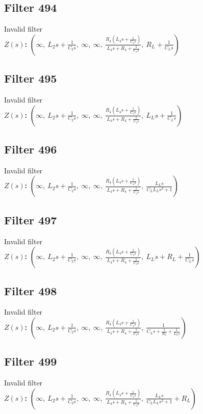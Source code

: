 \documentclass{article}
\begin{document}
\subsection*{Filter 494}
Invalid filter \\ 
\textbf{$Z(s)$:} $\left( \infty, \  L_{2} s + \frac{1}{C_{2} s}, \  \infty, \  \infty, \  \frac{R_{4} \left(L_{4} s + \frac{1}{C_{4} s}\right)}{L_{4} s + R_{4} + \frac{1}{C_{4} s}}, \  R_{L} + \frac{1}{C_{L} s}\right)$ \\ 
\subsection*{Filter 495}
Invalid filter \\ 
\textbf{$Z(s)$:} $\left( \infty, \  L_{2} s + \frac{1}{C_{2} s}, \  \infty, \  \infty, \  \frac{R_{4} \left(L_{4} s + \frac{1}{C_{4} s}\right)}{L_{4} s + R_{4} + \frac{1}{C_{4} s}}, \  L_{L} s + \frac{1}{C_{L} s}\right)$ \\ 
\subsection*{Filter 496}
Invalid filter \\ 
\textbf{$Z(s)$:} $\left( \infty, \  L_{2} s + \frac{1}{C_{2} s}, \  \infty, \  \infty, \  \frac{R_{4} \left(L_{4} s + \frac{1}{C_{4} s}\right)}{L_{4} s + R_{4} + \frac{1}{C_{4} s}}, \  \frac{L_{L} s}{C_{L} L_{L} s^{2} + 1}\right)$ \\ 
\subsection*{Filter 497}
Invalid filter \\ 
\textbf{$Z(s)$:} $\left( \infty, \  L_{2} s + \frac{1}{C_{2} s}, \  \infty, \  \infty, \  \frac{R_{4} \left(L_{4} s + \frac{1}{C_{4} s}\right)}{L_{4} s + R_{4} + \frac{1}{C_{4} s}}, \  L_{L} s + R_{L} + \frac{1}{C_{L} s}\right)$ \\ 
\subsection*{Filter 498}
Invalid filter \\ 
\textbf{$Z(s)$:} $\left( \infty, \  L_{2} s + \frac{1}{C_{2} s}, \  \infty, \  \infty, \  \frac{R_{4} \left(L_{4} s + \frac{1}{C_{4} s}\right)}{L_{4} s + R_{4} + \frac{1}{C_{4} s}}, \  \frac{1}{C_{L} s + \frac{1}{R_{L}} + \frac{1}{L_{L} s}}\right)$ \\ 
\subsection*{Filter 499}
Invalid filter \\ 
\textbf{$Z(s)$:} $\left( \infty, \  L_{2} s + \frac{1}{C_{2} s}, \  \infty, \  \infty, \  \frac{R_{4} \left(L_{4} s + \frac{1}{C_{4} s}\right)}{L_{4} s + R_{4} + \frac{1}{C_{4} s}}, \  \frac{L_{L} s}{C_{L} L_{L} s^{2} + 1} + R_{L}\right)$ \\ 
\end{document}
